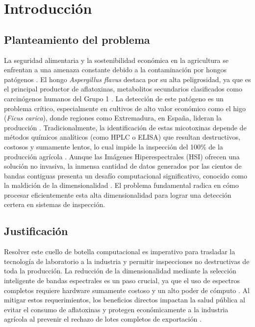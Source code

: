 \chapter{Introducción}

\section{Planteamiento del problema}
La seguridad alimentaria y la sostenibilidad económica en la agricultura se enfrentan a una amenaza constante debido a la contaminación por hongos patógenos \cite{cruz-carrasco_detection_2024}. El hongo \textit{Aspergillus flavus} destaca por su alta peligrosidad, ya que es el principal productor de aflatoxinas, metabolitos secundarios clasificados como carcinógenos humanos del Grupo 1 \cite{cruz-carrasco_detection_2024}. La detección de este patógeno es un problema crítico, especialmente en cultivos de alto valor económico como el higo (\textit{Ficus carica}), donde regiones como Extremadura, en España, lideran la producción \cite{cruz-carrasco_detection_2024}. Tradicionalmente, la identificación de estas micotoxinas depende de métodos químicos analíticos (como HPLC o ELISA) que resultan destructivos, costosos y sumamente lentos, lo cual impide la inspección del 100\% de la producción agrícola \cite{chu_classifying_2020, park_hyperspectral_2015}. Aunque las Imágenes Hiperespectrales (HSI) ofrecen una solución no invasiva, la inmensa cantidad de datos generados por las cientos de bandas contiguas presenta un desafío computacional significativo, conocido como la maldición de la dimensionalidad \cite{wang_review_2021, chu_classifying_2020, hughes_mean_1968}. El problema fundamental radica en cómo procesar eficientemente esta alta dimensionalidad para lograr una detección certera en sistemas de inspección.

\section{Justificación}
Resolver este cuello de botella computacional es imperativo para trasladar la tecnología de laboratorio a la industria y permitir inspecciones no destructivas de toda la producción. La reducción de la dimensionalidad mediante la selección inteligente de bandas espectrales es un paso crucial, ya que el uso de espectros completos requiere hardware sumamente costoso y un alto poder de cómputo \cite{sawant_survey_2020}. Al mitigar estos requerimientos, los beneficios directos impactan la salud pública al evitar el consumo de aflatoxinas y protegen económicamente a la industria agrícola al prevenir el rechazo de lotes completos de exportación \cite{cruz-carrasco_detection_2024}. 

